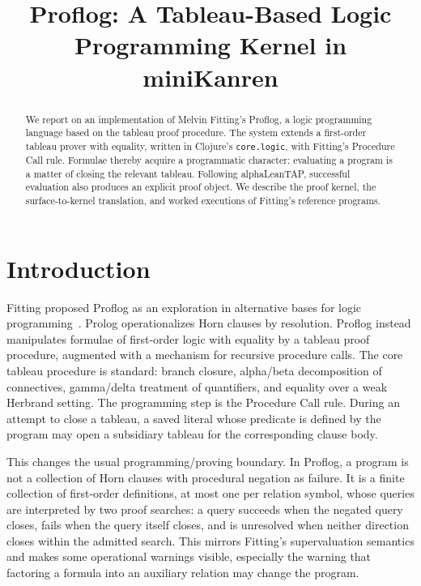 \documentclass[acmsmall,screen,review,anonymous]{acmart}
\title{Proflog: A Tableau-Based Logic Programming Kernel in miniKanren}
\begin{document}
\begin{abstract}
We report on an implementation of Melvin Fitting's Proflog, a logic programming
language based on the tableau proof procedure.  The system extends a first-order
tableau prover with equality, written in Clojure's \texttt{core.logic}, with
Fitting's Procedure Call rule.  Formulae thereby acquire a programmatic
character: evaluating a program is a matter of closing the relevant tableau.
Following alphaLeanTAP, successful evaluation also produces an explicit proof
object.  We describe the proof kernel, the surface-to-kernel translation, and
worked executions of Fitting's reference programs.
\end{abstract}



\maketitle

\section{Introduction}

Fitting proposed Proflog as an exploration in alternative bases for logic
programming~\cite{fitting1994tableaux}.  Prolog operationalizes Horn clauses by
resolution.  Proflog instead manipulates formulae of first-order logic with
equality by a tableau proof procedure, augmented with a mechanism for recursive
procedure calls.  The core tableau procedure is standard: branch closure,
alpha/beta decomposition of connectives, gamma/delta treatment of quantifiers,
and equality over a weak Herbrand setting.  The programming step is the
Procedure Call rule.  During an attempt to close a tableau, a saved literal
whose predicate is defined by the program may open a subsidiary tableau for the
corresponding clause body.

This changes the usual programming/proving boundary.  In Proflog, a program is
not a collection of Horn clauses with procedural negation as failure.  It is a
finite collection of first-order definitions, at most one per relation symbol,
whose queries are interpreted by two proof searches: a query succeeds when the
negated query closes, fails when the query itself closes, and is unresolved when
neither direction closes within the admitted search.  This mirrors Fitting's
supervaluation semantics and makes some operational warnings visible, especially
the warning that factoring a formula into an auxiliary relation may change the
program.
\end{document}
